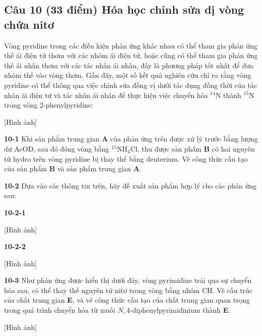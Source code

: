 \vspace{0.5cm}

\subsection{Câu 10 (33 điểm) Hóa học chỉnh sửa dị vòng chứa nitơ}

Vòng pyridine trong các điều kiện phản ứng khác nhau có thể tham gia phản ứng thế ái điện tử thơm với các nhóm ái điện tử, hoặc cũng có thể tham gia phản ứng thế ái nhân thơm với các tác nhân ái nhân, đây là phương pháp tốt nhất để đưa nhóm thế vào vòng thơm. Gần đây, một số kết quả nghiên cứu chỉ ra rằng vòng pyridine có thể thông qua việc chỉnh sửa đồng vị dưới tác dụng đồng thời của tác nhân ái điện tử và tác nhân ái nhân để thực hiện việc chuyển hóa $\mathrm{^{14}N}$ thành $\mathrm{^{15}N}$ trong vòng 2-phenylpyridine:

\begin{center}
    [Hình ảnh]
\end{center}

\noindent
\textbf{10-1} Khi sản phẩm trung gian \textbf{A} của phản ứng trên được xử lý trước bằng lượng dư AcOD, sau đó đóng vòng bằng $\mathrm{^{15}NH_4Cl}$, thu được sản phẩm \textbf{B} có hai nguyên tử hydro trên vòng pyridine bị thay thế bằng deuterium. Vẽ công thức cấu tạo của sản phẩm \textbf{B} và sản phẩm trung gian \textbf{A}.

\vspace{0.2cm}

\noindent
\textbf{10-2} Dựa vào các thông tin trên, hãy đề xuất sản phẩm hợp lý cho các phản ứng sau:

\noindent
\textbf{10-2-1}
\begin{center}
    [Hình ảnh]
\end{center}

\noindent
\textbf{10-2-2}
\begin{center}
    [Hình ảnh]
\end{center}

\vspace{0.2cm}

\noindent
\textbf{10-3} Như phản ứng được hiển thị dưới đây, vòng pyrimidine trải qua sự chuyển hóa sau, có thể thay thế nguyên tử nitơ trong vòng bằng nhóm CH. Vẽ cấu trúc của chất trung gian \textbf{E}, và vẽ công thức cấu tạo của chất trung gian quan trọng trong quá trình chuyển hóa từ muối $N,4$-diphenylpyrimidinium thành \textbf{E}.

\begin{center}
    [Hình ảnh]
\end{center}

